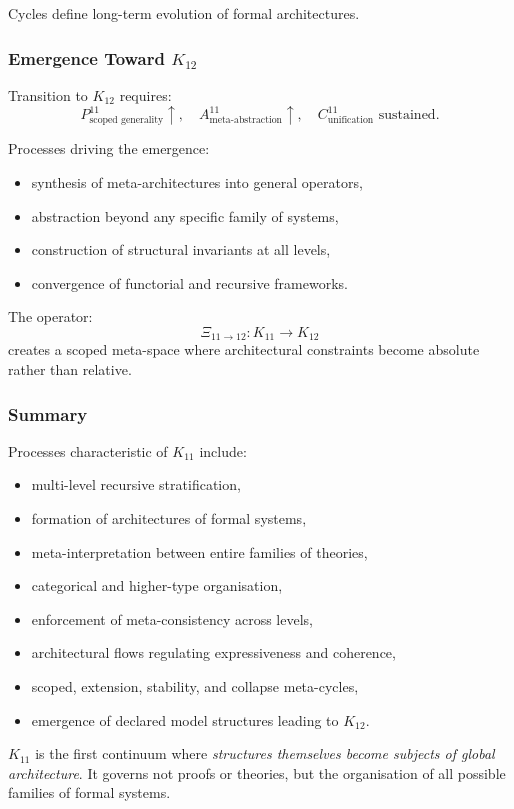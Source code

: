 Cycles define long-term evolution of formal architectures.

\subsubsection{Emergence Toward $K_{12}$}

Transition to $K_{12}$ requires:
\[
P^{11}_{\text{scoped generality}} \uparrow,\quad
A^{11}_{\text{meta-abstraction}} \uparrow,\quad
C^{11}_{\text{unification}} \text{ sustained.}
\]

Processes driving the emergence:
\begin{itemize}
    \item synthesis of meta-architectures into general operators,
    \item abstraction beyond any specific family of systems,
    \item construction of structural invariants at all levels,
    \item convergence of functorial and recursive frameworks.
\end{itemize}

The operator:
\[
\Xi_{11 \to 12} : K_{11} \rightarrow K_{12}
\]
creates a scoped meta-space where architectural constraints 
become absolute rather than relative.

\subsubsection{Summary}

Processes characteristic of $K_{11}$ include:
\begin{itemize}
    \item multi-level recursive stratification,
    \item formation of architectures of formal systems,
    \item meta-interpretation between entire families of theories,
    \item categorical and higher-type organisation,
    \item enforcement of meta-consistency across levels,
    \item architectural flows regulating expressiveness and coherence,
    \item scoped, extension, stability, and collapse meta-cycles,
    \item emergence of declared model structures leading to $K_{12}$.
\end{itemize}

$K_{11}$ is the first continuum where \emph{structures themselves become subjects of global architecture}.  
It governs not proofs or theories, but the organisation of all possible families of formal systems.
